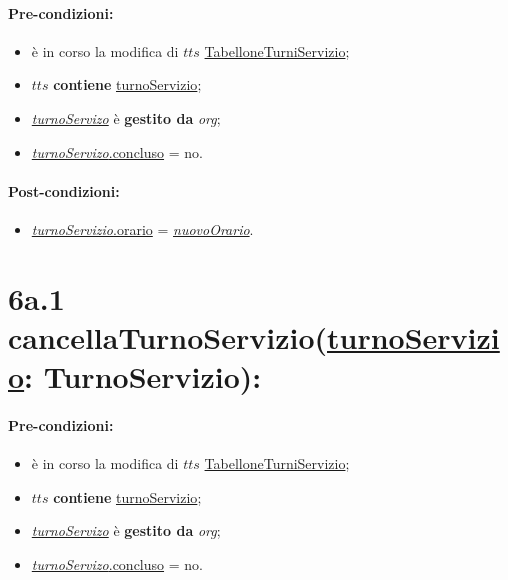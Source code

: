 \paragraph{Pre-condizioni:}
\begin{itemize}
 \item è in corso la modifica di $tts$ \underline{TabelloneTurniServizio};
 \item $tts$ \textbf{contiene} \underline{turnoServizio};
   \item \underline{\textit{turnoServizo}} è \textbf{gestito da} {\textit{org}};
   \item \underline{\textit{turnoServizo}.concluso} = no.
\end{itemize}

\paragraph{Post-condizioni:}

\begin{itemize}
    \item \underline{\textit{turnoServizio}.orario} = \underline{\textit{nuovoOrario}}.
\end{itemize}

\section*{6a.1 cancellaTurnoServizio(\underline{turnoServizio}: TurnoServizio):}

\paragraph{Pre-condizioni:}
\begin{itemize}
 \item è in corso la modifica di $tts$ \underline{TabelloneTurniServizio};
 \item $tts$ \textbf{contiene} \underline{turnoServizio};
   \item \underline{\textit{turnoServizo}} è \textbf{gestito da} {\textit{org}};
   \item \underline{\textit{turnoServizo}.concluso} = no.
\end{itemize}

